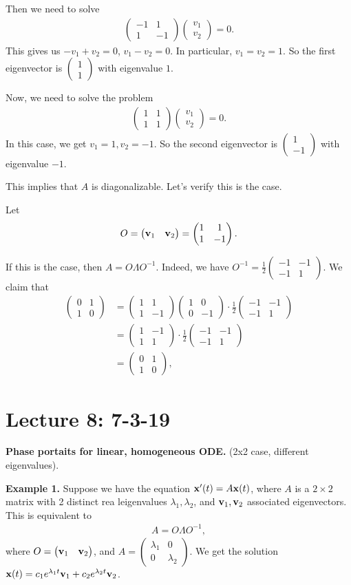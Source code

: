 \documentclass{article}
\newcommand{\mat}[1]{\begin{pmatrix}#1\end{pmatrix}}
\begin{document}
Then we need to solve
\begin{align*}
  \mat{-1 & 1 \\ 1 & -1} \mat{v_1 \\ v_2} = 0.
\end{align*}
This gives us $-v_1 + v_2 = 0$, $v_1 - v_2 = 0$.  In particular, $v_1 = v_2 = 1$.  So the first eigenvector is $\mat{1 \\ 1}$ with eigenvalue $1$.

Now, we need to solve the problem
\begin{align*}
  \mat{1 & 1 \\ 1 & 1} \mat{v_1 \\ v_2} = 0.
\end{align*}
In this case, we get $v_1 = 1, v_2 = -1$.  So the second eigenvector is $\mat{1 \\ -1}$ with eigenvalue $-1$.

This implies that $A$ is diagonalizable.  Let's verify this is the case.

Let
\begin{align*}
  O = \mat{\mbf{v}_1 & \mbf{v}_2} = \mat{1 & 1 \\ 1 & -1}.
\end{align*}

If this is the case, then $A = O \Lambda O^{-1}$.  Indeed, we have $O^{-1} = \frac{1}{2} \mat{-1 & -1 \\ -1 & 1}$.  We claim that
\begin{align*}
  \mat{0 & 1 \\ 1 & 0} &= \mat{1 & 1 \\ 1 & -1} \mat{1 & 0 \\ 0 & -1} \cdot \frac{1}{2} \mat{-1 & -1 \\ -1 & 1} \\
  &= \mat{1 & -1 \\ 1 & 1} \cdot \frac{1}{2} \mat{-1 & -1 \\ -1 & 1} \\
  &= \mat{0 & 1 \\ 1 & 0},
\end{align*}



\section{Lecture 8: 7-3-19}

{\bf Phase portaits for linear, homogeneous ODE.} (2x2 case, different eigenvalues).

{\bf Example 1.} Suppose we have the equation $\mathbf{x}'(t) = A \mathbf{x}(t)$, where $A$ is a $2 \times 2$ matrix with 2 distinct rea leigenvalues $\lambda_1, \lambda_2$, and $\mathbf{v}_1, \mathbf{v}_2$ associated eigenvectors.  This is equivalent to
\begin{align*}
  A = O \Lambda O^{-1},
\end{align*}
where $O = \mat{\mbf{v}_1 & \mbf{v}_2}$, and $A = \mat{\lambda_1 & 0 \\ 0 & \lambda_2}$.  We get the solution $\mathbf{x}(t) = c_1 e^{\lambda_1 t} \mathbf{v}_1 + c_2 e^{\lambda_2 t} \mathbf{v}_2$.
\end{document}
